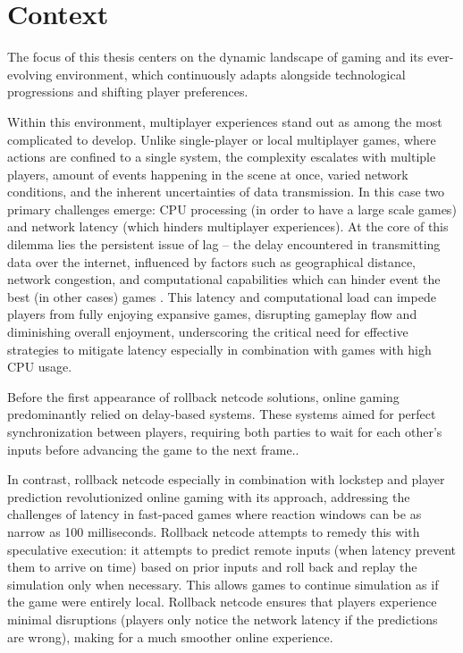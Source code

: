 \chapter{Context}

The focus of this thesis centers on the dynamic landscape of gaming and its ever-evolving environment, which continuously adapts alongside technological progressions and shifting player preferences.\newline

Within this environment, multiplayer experiences stand out as among the most complicated to develop. Unlike single-player or local multiplayer games, where actions are confined to a single system, the complexity escalates with multiple players, amount of events happening in the scene at once, varied network conditions, and the inherent uncertainties of data transmission. In this case two primary challenges emerge: CPU processing (in order to have a large scale games) and network latency (which hinders multiplayer experiences). At the core of this dilemma lies the persistent issue of lag – the delay encountered in transmitting data over the internet, influenced by factors such as geographical distance, network congestion, and computational capabilities which can hinder event the best (in other cases) games \cite{Effects_of_latency}. This latency and computational load can impede players from fully enjoying expansive games, disrupting gameplay flow and diminishing overall enjoyment, underscoring the critical need for effective strategies to mitigate latency especially in combination with games with high CPU usage.\newline

Before the first appearance of rollback netcode solutions, online gaming predominantly relied on delay-based systems. These systems aimed for perfect synchronization between players, requiring both parties to wait for each other's inputs before advancing the game to the next frame.\cite{Delaybased_rollback_explanation}.\newline

In contrast, rollback netcode especially in combination with lockstep and player prediction revolutionized online gaming with its approach, addressing the challenges of latency in fast-paced games where reaction windows can be as narrow as 100 milliseconds. Rollback netcode attempts to remedy this with speculative execution: it attempts to predict remote inputs (when latency prevent them to arrive on time) based on prior inputs and roll back and replay the simulation only when necessary. This allows games to continue simulation as if the game were entirely local. Rollback netcode ensures that players experience minimal disruptions (players only notice the network latency if the predictions are wrong), making for a much smoother online experience. \cite{Rollback_overview}\newline

